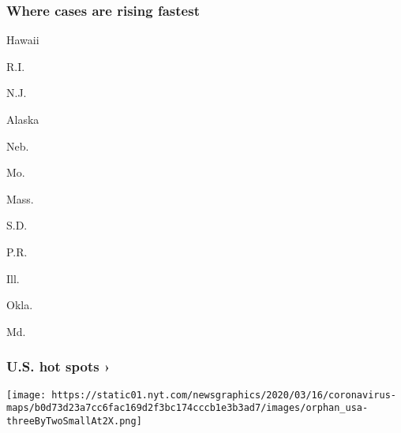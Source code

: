 \href{https://www.nytimes.com/interactive/2020/us/coronavirus-us-cases.html}{}

\hypertarget{where-cases-are-rising-fastest}{%
\subsubsection{\texorpdfstring{Where cases are \textbf{rising}
fastest}{Where cases are rising fastest}}\label{where-cases-are-rising-fastest}}

\href{https://www.nytimes.com/interactive/2020/us/hawaii-coronavirus-cases.html}{}

Hawaii
\href{https://www.nytimes.com/interactive/2020/us/rhode-island-coronavirus-cases.html}{}

R.I.
\href{https://www.nytimes.com/interactive/2020/us/new-jersey-coronavirus-cases.html}{}

N.J.
\href{https://www.nytimes.com/interactive/2020/us/alaska-coronavirus-cases.html}{}

Alaska
\href{https://www.nytimes.com/interactive/2020/us/nebraska-coronavirus-cases.html}{}

Neb.
\href{https://www.nytimes.com/interactive/2020/us/missouri-coronavirus-cases.html}{}

Mo.
\href{https://www.nytimes.com/interactive/2020/us/massachusetts-coronavirus-cases.html}{}

Mass.
\href{https://www.nytimes.com/interactive/2020/us/south-dakota-coronavirus-cases.html}{}

S.D.
\href{https://www.nytimes.com/interactive/2020/us/puerto-rico-coronavirus-cases.html}{}

P.R.
\href{https://www.nytimes.com/interactive/2020/us/illinois-coronavirus-cases.html}{}

Ill.
\href{https://www.nytimes.com/interactive/2020/us/oklahoma-coronavirus-cases.html}{}

Okla.
\href{https://www.nytimes.com/interactive/2020/us/maryland-coronavirus-cases.html}{}

Md.

\href{https://www.nytimes.com/interactive/2020/us/coronavirus-us-cases.html}{}

\hypertarget{us-hot-spots-}{%
\subsubsection{U.S. hot spots ›}\label{us-hot-spots-}}

\texttt{[image: https://static01.nyt.com/newsgraphics/2020/03/16/coronavirus-maps/b0d73d23a7cc6fac169d2f3bc174cccb1e3b3ad7/images/orphan\_usa-threeByTwoSmallAt2X.png]}
\href{https://www.nytimes.com/interactive/2020/world/coronavirus-maps.html}{}

